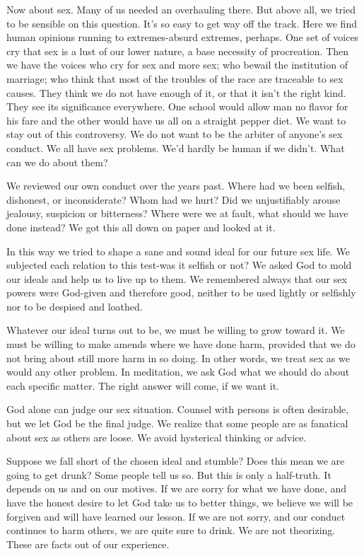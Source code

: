 \begin{biblechapter}
Now about sex.  Many of us needed an overhauling there.  But above all, we tried to be sensible on this question.  It's so easy to get way off the track.  Here we find human opinions running to extremes-absurd extremes, perhaps.  One set of voices cry that sex is a lust of our lower nature, a base necessity of procreation.  Then we have the voices who cry for sex and more sex; who bewail the institution of marriage; who think that most of the troubles of the race are traceable to sex causes.  They think we do not have enough of it, or that it isn't the right kind.  They see its significance everywhere.  One school would allow man no flavor for his fare and the other would have us all on a straight pepper diet.  We want to stay out of this controversy.  We do not want to be the arbiter of anyone's sex conduct.  We all have sex problems.  We'd hardly be human if we didn't.  What can we do about them?

We reviewed our own conduct over the years past.  Where had we been selfish, dishonest, or inconsiderate?  Whom had we hurt?  Did we unjustifiably arouse jealousy, suspicion or bitterness?  Where were we at fault, what should we have done instead?  We got this all down on paper and looked at it.

In this way we tried to shape a sane and sound ideal for our future sex life.  We subjected each relation to this test-was it selfish or not?  We asked God to mold our ideals and help us to live up to them.  We remembered always that our sex powers were God-given and therefore good, neither to be used lightly or selfishly nor to be despised and loathed.

Whatever our ideal turns out to be, we must be willing to grow toward it.  We must be willing to make amends where we have done harm,  provided that we do not bring about still more harm in so doing.  In other words, we treat sex as we would any other problem.  In meditation, we ask God what we should do about each specific matter.  The right answer will come, if we want it.

God alone can judge our sex situation.  Counsel with persons is often desirable, but we let God be the final judge.  We realize that some people are as fanatical about sex as others are loose.  We avoid hysterical thinking or advice.

Suppose we fall short of the chosen ideal and stumble?  Does this mean we are going to get drunk?  Some people tell us so.  But this is only a half-truth.  It depends on us and on our motives.  If we are sorry for what we have done, and have the honest desire to let God take us to better things, we believe we will be forgiven and will have learned our lesson.  If we are not sorry, and our conduct continues to harm others, we are quite sure to drink.  We are not theorizing.  These are facts out of our experience.


\end{biblechapter}
